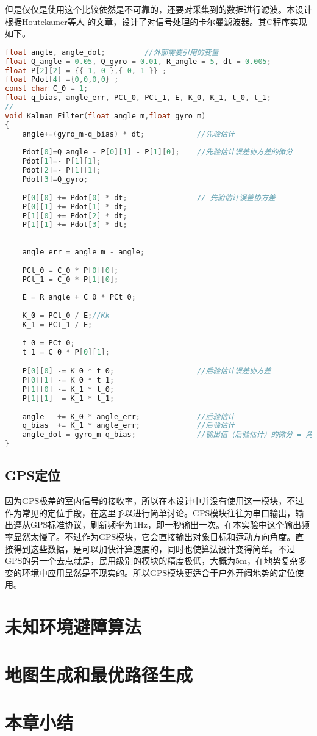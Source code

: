 但是仅仅是使用这个比较依然是不可靠的，还要对采集到的数据进行滤波。本设计根据Houtekamer等人 的文章，设计了对信号处理的卡尔曼滤波器。其C程序实现如下。
\begin{lstlisting}[language={C}, caption={Kalman滤波的C程序代码}]
float angle, angle_dot; 		//外部需要引用的变量
float Q_angle = 0.05, Q_gyro = 0.01, R_angle = 5, dt = 0.005;     
float P[2][2] = {{ 1, 0 },{ 0, 1 }} ;	
float Pdot[4] ={0,0,0,0} ;
const char C_0 = 1;
float q_bias, angle_err, PCt_0, PCt_1, E, K_0, K_1, t_0, t_1;
//-------------------------------------------------------
void Kalman_Filter(float angle_m,float gyro_m)			
{
	angle+=(gyro_m-q_bias) * dt;			//先验估计
	
	Pdot[0]=Q_angle - P[0][1] - P[1][0];	//先验估计误差协方差的微分
	Pdot[1]=- P[1][1];
	Pdot[2]=- P[1][1];
	Pdot[3]=Q_gyro;
	
	P[0][0] += Pdot[0] * dt;				// 先验估计误差协方差
	P[0][1] += Pdot[1] * dt;
	P[1][0] += Pdot[2] * dt;
	P[1][1] += Pdot[3] * dt;
	
	
	angle_err = angle_m - angle;			
	
	PCt_0 = C_0 * P[0][0];
	PCt_1 = C_0 * P[1][0];
	
	E = R_angle + C_0 * PCt_0;
	
	K_0 = PCt_0 / E;//Kk
	K_1 = PCt_1 / E;
	
	t_0 = PCt_0;
	t_1 = C_0 * P[0][1];

	P[0][0] -= K_0 * t_0;					//后验估计误差协方差
	P[0][1] -= K_0 * t_1;
	P[1][0] -= K_1 * t_0;
	P[1][1] -= K_1 * t_1;
	
	angle	+= K_0 * angle_err;				//后验估计
	q_bias	+= K_1 * angle_err;				//后验估计
	angle_dot = gyro_m-q_bias;				//输出值（后验估计）的微分 = 角速度
}
\end{lstlisting}
\subsection{GPS定位}
因为GPS极差的室内信号的接收率，所以在本设计中并没有使用这一模块，不过作为常见的定位手段，在这里予以进行简单讨论。GPS模块往往为串口输出，输出遵从GPS标准协议，刷新频率为1Hz，即一秒输出一次。在本实验中这个输出频率显然太慢了。不过作为GPS模块，它会直接输出对象目标和运动方向角度。直接得到这些数据，是可以加快计算速度的，同时也使算法设计变得简单。不过GPS的另一个去点就是，民用级别的模块的精度极低，大概为5m，在地势复杂多变的环境中应用显然是不现实的。所以GPS模块更适合于户外开阔地势的定位使用。
\section{未知环境避障算法}

\section{地图生成和最优路径生成}
\section{本章小结}
